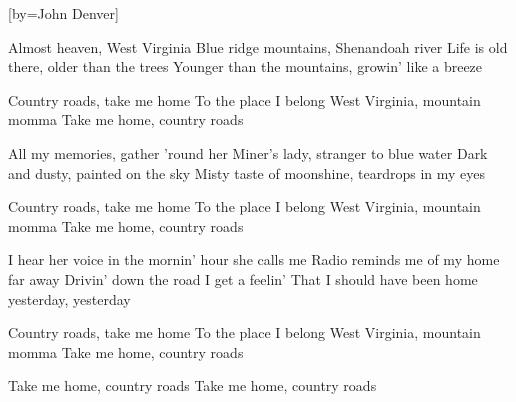  

[by=John Denver]




\beginverse
Almost heaven, West Virginia
Blue ridge mountains, Shenandoah river
Life is old there, older than the trees
Younger than the mountains, growin' like a breeze
\endverse

\beginchorus
Country roads, take me home
To the place I belong
West Virginia, mountain momma
Take me home, country roads
\endchorus

\beginverse
All my memories, gather 'round her
Miner's lady, stranger to blue water
Dark and dusty, painted on the sky
Misty taste of moonshine, teardrops in my eyes
\endverse

\beginchorus
Country roads, take me home
To the place I belong
West Virginia, mountain momma
Take me home, country roads
\endchorus

\beginverse
I hear her voice in the mornin' hour she calls me
Radio reminds me of my home far away
Drivin' down the road I get a feelin'
That I should have been home yesterday, yesterday
\endverse

\beginchorus
{}
Country roads, take me home
To the place I belong
West Virginia, mountain momma
Take me home, country roads
\endchorus

\beginchorus
Take me home, country roads
Take me home, country roads
\endchorus


\endsong
